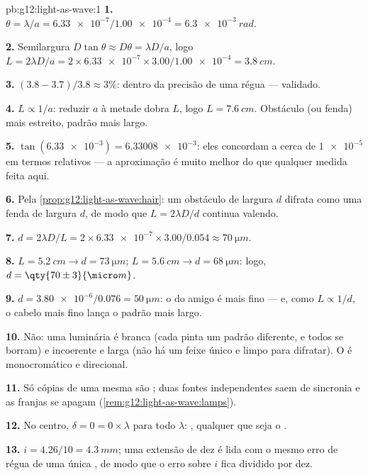 \begin{solution}{pb:g12:light-as-wave:1}
\textbf{1.} $\theta = \lambda/a = \num{6.33e-7}/\num{1.00e-4} =
\qty{6.3e-3}{rad}$.

\textbf{2.} Semilargura $D\tan\theta \approx D\theta = \lambda D/a$,
logo $L = 2\lambda D/a = 2 \times \num{6.33e-7} \times
3.00/\num{1.00e-4} = \qty{3.8}{cm}$.

\textbf{3.} $(3.8 - 3.7)/3.8 \approx 3\%$: dentro da precisão de uma
régua --- validado.

\textbf{4.} $L \propto 1/a$: reduzir $a$ à metade dobra $L$, logo
$L = \qty{7.6}{cm}$. Obstáculo (ou fenda) mais estreito, padrão mais
largo.

\textbf{5.} $\tan(\num{6.33e-3}) = \num{6.33008e-3}$: eles concordam a
cerca de $\num{1e-5}$ em termos relativos --- a aproximação é muito
melhor do que qualquer medida feita aqui.

\textbf{6.} Pela \cref{prop:g12:light-as-wave:hair}: um obstáculo de
largura $d$ difrata como uma fenda de largura $d$, de modo que
$L = 2\lambda D/d$ continua valendo.

\textbf{7.} $d = 2\lambda D/L = 2 \times \num{6.33e-7} \times
3.00/0.054 \approx \qty{70}{\micro m}$.

\textbf{8.} $L = \qty{5.2}{cm} \to d = \qty{73}{\micro m}$;
$L = \qty{5.6}{cm} \to d = \qty{68}{\micro m}$: logo,
$d = \qty{70 \pm 3}{\micro m}$.

\textbf{9.} $d = \num{3.80e-6}/0.076 = \qty{50}{\micro m}$: o do amigo é
mais fino --- e, como $L \propto 1/d$, o cabelo mais fino lança o padrão
mais largo.

\textbf{10.} Não: uma luminária é branca (cada  pinta
um padrão diferente, e todos se borram) e incoerente e larga (não há um
feixe único e limpo para difratar). O  é monocromático e
direcional.

\textbf{11.} Só cópias de uma mesma  são ; duas fontes
independentes saem de sincronia e as franjas se apagam
(\cref{rem:g12:light-as-wave:lamps}).

\textbf{12.} No centro, $\delta = 0 = 0 \times \lambda$ para todo
$\lambda$: , qualquer que seja o .

\textbf{13.} $i = 4.26/10 = \qty{4.3}{mm}$; uma extensão de dez é lida
com o mesmo erro de régua de uma única , de modo que o erro
sobre $i$ fica dividido por dez.


\end{solution}
